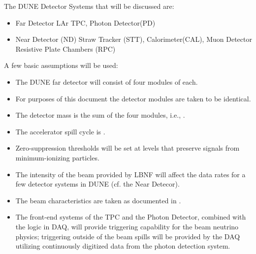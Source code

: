 The DUNE Detector Systems that will be discussed are:
\begin{itemize}
\item Far Detector LAr TPC, Photon Detector(PD)
\item Near Detector (ND) Straw Tracker (STT), Calorimeter(CAL), Muon Detector Resistive Plate Chambers (RPC)
\end{itemize}





A few basic assumptions will be used: 
\begin{itemize}
\item The DUNE far detector will consist of four %
modules of \tpcdetectormass each.
\item For purposes of this document the detector modules are taken to be identical.
\item %
The detector mass is the sum of the four modules, i.e., %
\dunedetectormass.
\item The accelerator spill cycle is \beamspillcycle.
\item Zero-suppression thresholds will be set at levels that preserve signals from minimum-ionizing particles.
\item The intensity of the beam provided by LBNF will affect the data rates for a few detector
systems in DUNE (cf. the Near Detecor). 
\item The beam characteristics are taken as documented in \vollbnf.
\item The front-end systems of the TPC and the Photon Detector, combined
with the logic in DAQ, will provide triggering capability for the beam neutrino physics; 
triggering outside of the beam spills will be provided by the DAQ utilizing continuously digitized
data from the photon detection system. %
\end{itemize}



